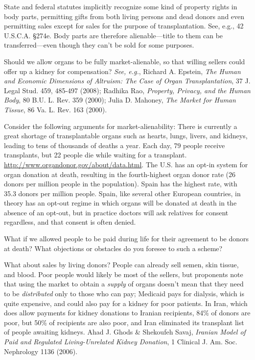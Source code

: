 \item State and federal statutes implicitly recognize some kind of property
rights
in body parts, permitting gifts from both living persons and dead donors and
even permitting sales except for sales for the purpose of transplantation. 
See, e.g., 42 U.S.C.A. {\S}274e.  Body parts are therefore alienable---title
to them can be transferred---even though they can't be sold for some purposes.
 
Should we allow organs to be fully market-alienable, so that willing sellers
could offer up a kidney for compensation?  \textit{See, e.g.}, Richard A.
Epstein, \emph{The Human and Economic Dimensions of Altruism: The Case of Organ
Transplantation}, 37 J. Legal Stud. 459, 485-497 (2008); Radhika Rao,
\emph{Property,
Privacy, and the Human Body}, 80 B.U. L. Rev. 359 (2000); Julia D. Mahoney,
\emph{The
Market for Human Tissue}, 86 Va. L. Rev. 163 (2000).

Consider the following arguments for market-alienability: There is currently a
great shortage of transplantable organs such as hearts, lungs, livers, and
kidneys, leading to tens of thousands of deaths a year. Each day, 79 people
receive transplants, but 22 people die while waiting for a transplant. 
\url{http://www.organdonor.gov/about/data.html}.  The U.S. has an opt-in system
for organ donation at death, resulting in the fourth-highest organ donor rate
(26 donors per million people in the population).  Spain has the highest rate,
with 35.3 donors per million people.  Spain, like several other European
countries, in theory has an opt-out regime in which organs will be donated at
death in the absence of an opt-out, but in practice doctors will ask relatives
for consent regardless, and that consent is often denied.

What if we allowed people to be paid during life for their agreement to be
donors at death?  What objections or obstacles do you foresee to such a scheme?

What about sales by living donors?  People can already sell semen, skin tissue,
and blood.  Poor people would likely be most of the sellers, but proponents
note that using the market to obtain a \textit{supply} of organs doesn't mean
that they need to be \textit{distributed} only to those who can pay; Medicaid
pays for dialysis, which is quite expensive, and could also pay for a kidney
for poor patients.  In Iran, which does allow payments for kidney donations to
Iranian recipients, 84\% of donors are poor, but 50\% of recipients are also
poor, and Iran eliminated its transplant list of people awaiting kidneys.  Ahad
J. Ghods \& Shekoufeh Savaj, \emph{Iranian Model of Paid and Regulated
Living-Unrelated Kidney Donation}, 1 Clinical J. Am. Soc. Nephrology 1136
(2006).


